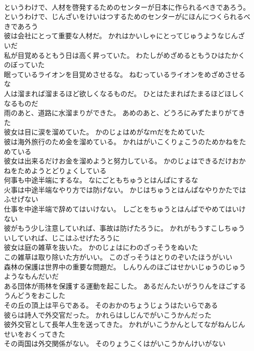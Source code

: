 \documentclass[8pt]{extreport}
\begin{document}
\begin{CJK}{UTF8}{min}
\\	というわけで、人材を啓発するためのセンターが日本に作られるべきであろう。	というわけで、じんざいをけいはつするためのセンターがにほんにつくられるべきであろう 
\\	彼は会社にとって重要な人材だ。	かれはかいしゃにとってじゅうようなじんざいだ 
\\	私が目覚めるともう日は高く昇っていた。	わたしがめざめるともうひはたかくのぼっていた 
\\	眠っているライオンを目覚めさせるな。	ねむっているライオンをめざめさせるな 
\\	人は溜まれば溜まるほど欲しくなるものだ。	ひとはたまればたまるほどほしくなるものだ 
\\	雨のあと、道路に水溜まりができた。	あめのあと、どうろにみずたまりがてきた 
\\	彼女は目に涙を溜めていた。	かのじょはめがなｍだをためていた 
\\	彼は海外旅行のため金を溜めている。	かれはがいこくりょこうのためかねをためている 
\\	彼女は出来るだけお金を溜めようと努力している。	かのじょはできるだけおかねをためようとどりょくしている 
\\	何事も中途半端にするな。	なにごともちゅうとはんぱにするな 
\\	火事は中途半端なやり方では防げない。	かじはちゅうとはんぱなやりかたではふせげない 
\\	仕事を中途半端で辞めてはいけない。	しごとをちゅうとはんぱでやめてはいけない 
\\	彼がもう少し注意していれば、事故は防げたろうに。	かれがもうすこしちゅういしていれば、じこはふせげたろうに 
\\	彼女は庭の雑草を抜いた。	かのじょはにわのざっそうをぬいた 
\\	この雑草は取り除いた方がいい。	このざっそうはとりのぞいたほうがいい 
\\	森林の保護は世界中の重要な問題だ。	しんりんのほごはせかいじゅうのじゅうようなもんだいだ 
\\	ある団体が雨林を保護する運動を起こした。	あるだんたいがうりんをほごするうんどうをおこした 
\\	その丘の頂上は平らである。	そのおかのちょうじょうはたいらである 
\\	彼らは詩人で外交官だった。	かれらはしじんでがいこうかんだった 
\\	彼外交官として長年人生を送ってきた。	かれがいこうかんとしてながねんじんせいをおくってきた 
\\	その両国は外交関係がない。	そのりょうこくはがいこうかんけいがない 

\end{CJK}
\end{document}
